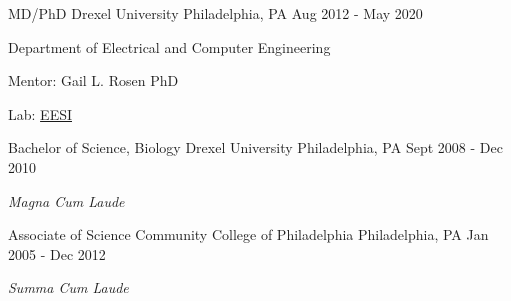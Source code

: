 

\begin{cventries}

  \cventry
    {MD/PhD} %
    {Drexel University} %
    {Philadelphia, PA} %
    {Aug 2012 - May 2020} %
    {
      \begin{cvitems} %
         \item Department of Electrical and Computer Engineering
         \item Mentor: Gail L. Rosen PhD
         \item Lab: \href{http://drexeleesi.com/}{EESI}
      \end{cvitems}
    }
  \cventry
    {Bachelor of Science, Biology} %
    {Drexel University} %
    {Philadelphia, PA} %
    {Sept 2008 - Dec 2010} %
    {
      \begin{cvitems} %
         \item \textit{Magna Cum Laude}
      \end{cvitems}
    }
  \cventry
    {Associate of Science} %
    {Community College of Philadelphia} %
    {Philadelphia, PA} %
    {Jan 2005 - Dec 2012} %
    {
      \begin{cvitems} %
         \item \textit{Summa Cum Laude}
      \end{cvitems}
    }

\end{cventries}
